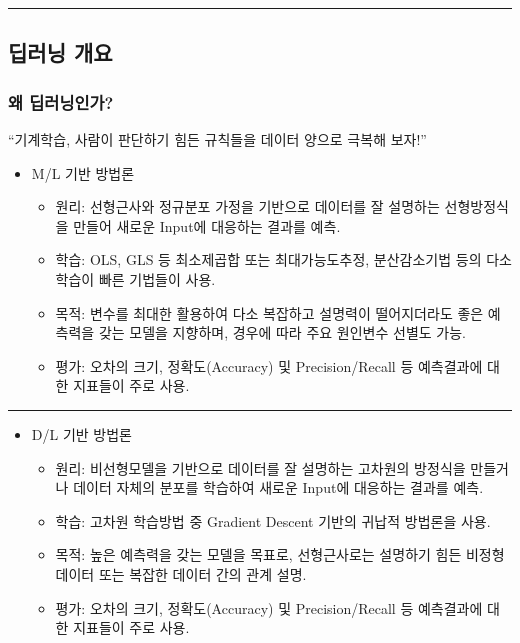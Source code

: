 \documentclass[11pt]{article}
\providecommand{\tightlist}{%
      \setlength{\itemsep}{0pt}\setlength{\parskip}{0pt}}
\begin{document}
    \begin{center}\rule{0.5\linewidth}{\linethickness}\end{center}

\hypertarget{uxb525uxb7ecuxb2dd-uxac1cuxc694}{%
\subsection{딥러닝 개요}\label{uxb525uxb7ecuxb2dd-uxac1cuxc694}}

    \hypertarget{uxc65c-uxb525uxb7ecuxb2dduxc778uxac00}{%
\subsubsection{왜
딥러닝인가?}\label{uxc65c-uxb525uxb7ecuxb2dduxc778uxac00}}

``기계학습, 사람이 판단하기 힘든 규칙들을 데이터 양으로 극복해 보자!''

\begin{itemize}
\tightlist
\item
  M/L 기반 방법론

  \begin{itemize}
  \tightlist
  \item
    원리: 선형근사와 정규분포 가정을 기반으로 데이터를 잘 설명하는
    선형방정식을 만들어 새로운 Input에 대응하는 결과를 예측.
  \item
    학습: OLS, GLS 등 최소제곱합 또는 최대가능도추정, 분산감소기법 등의
    다소 학습이 빠른 기법들이 사용.
  \item
    목적: 변수를 최대한 활용하여 다소 복잡하고 설명력이 떨어지더라도
    좋은 예측력을 갖는 모델을 지향하며, 경우에 따라 주요 원인변수 선별도
    가능.
  \item
    평가: 오차의 크기, 정확도(Accuracy) 및 Precision/Recall 등
    예측결과에 대한 지표들이 주로 사용. 
  \end{itemize}
\end{itemize}

\begin{center}\rule{0.5\linewidth}{\linethickness}\end{center}

\begin{itemize}
\tightlist
\item
  D/L 기반 방법론

  \begin{itemize}
  \tightlist
  \item
    원리: 비선형모델을 기반으로 데이터를 잘 설명하는 고차원의 방정식을
    만들거나 데이터 자체의 분포를 학습하여 새로운 Input에 대응하는
    결과를 예측.
  \item
    학습: 고차원 학습방법 중 Gradient Descent 기반의 귀납적 방법론을
    사용.
  \item
    목적: 높은 예측력을 갖는 모델을 목표로, 선형근사로는 설명하기 힘든
    비정형 데이터 또는 복잡한 데이터 간의 관계 설명.
  \item
    평가: 오차의 크기, 정확도(Accuracy) 및 Precision/Recall 등
    예측결과에 대한 지표들이 주로 사용. 
  \end{itemize}
\end{itemize}
\end{document}
